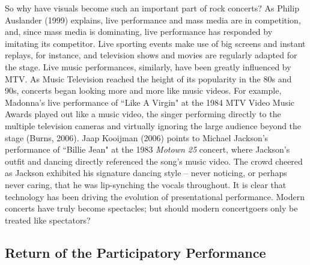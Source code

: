 So why have visuals become such an important part of rock concerts? As Philip Auslander (1999) explains, live performance and mass media are in competition, and, since mass media is dominating, live performance has responded by imitating its competitor. Live sporting events make use of big screens and instant replays, for instance, and television shows and movies are regularly adapted for the stage. Live music performances, similarly, have been greatly influenced by MTV. As Music Television reached the height of its popularity in the 80s and 90s, concerts began looking more and more like music videos. For example, Madonna's live performance of ``Like A Virgin" at the 1984 MTV Video Music Awards played out like a music video, the singer performing directly to the multiple television cameras and virtually ignoring the large audience beyond the stage (Burns, 2006). Jaap Kooijman (2006) points to Michael Jackson's performance of ``Billie Jean" at the 1983 \textit{Motown 25} concert, where Jackson's outfit and dancing directly referenced the song's music video. The crowd cheered as Jackson exhibited his signature dancing style -- never noticing, or perhaps never caring, that he was lip-synching the vocals throughout. It is clear that technology has been driving the evolution of presentational performance. Modern concerts have truly become spectacles; but should modern concertgoers only be treated like spectators?

\subsection{Return of the Participatory Performance}


